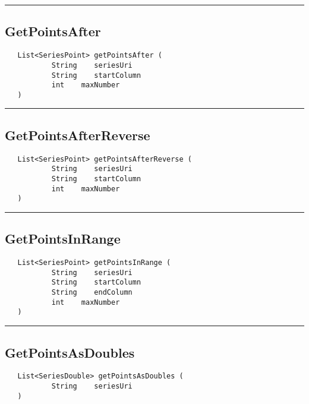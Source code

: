 \rule{15cm}{2pt}
\subsection{GetPointsAfter}
\label{Api:GetPointsAfter}
\begin{verbatim}
   List<SeriesPoint> getPointsAfter (
           String    seriesUri
           String    startColumn
           int    maxNumber
   )
\end{verbatim}



\rule{15cm}{2pt}
\subsection{GetPointsAfterReverse}
\label{Api:GetPointsAfterReverse}
\begin{verbatim}
   List<SeriesPoint> getPointsAfterReverse (
           String    seriesUri
           String    startColumn
           int    maxNumber
   )
\end{verbatim}



\rule{15cm}{2pt}
\subsection{GetPointsInRange}
\label{Api:GetPointsInRange}
\begin{verbatim}
   List<SeriesPoint> getPointsInRange (
           String    seriesUri
           String    startColumn
           String    endColumn
           int    maxNumber
   )
\end{verbatim}



\rule{15cm}{2pt}
\subsection{GetPointsAsDoubles}
\label{Api:GetPointsAsDoubles}
\begin{verbatim}
   List<SeriesDouble> getPointsAsDoubles (
           String    seriesUri
   )
\end{verbatim}



